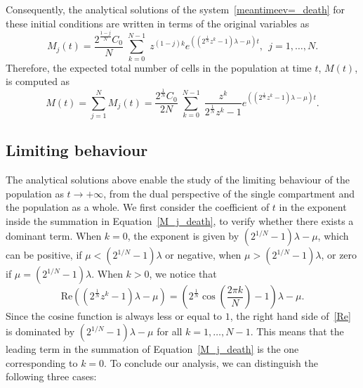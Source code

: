 \documentclass[10pt]{article}
\numberwithin{equation}{section}
\begin{document}
Consequently, the analytical solutions of the system~\eqref{meantimeev=_death} for these initial conditions are written in terms of the original variables as
\begin{equation} \label{M_j_death}
M_j(t)=\frac{2^{\frac{1-j}{N}}C_0}{N} \; \sum_{k=0}^{N-1} 
\; z^{(1-j)k} 
e^{\left(\left(2^{\frac{1}{N}} z^k -1 \right)\lambda - \mu \right) t},
\ \ j=1,\ldots,N.
\end{equation}
Therefore, the  expected total number of cells in the population at time
$t$, $M(t)$, is computed as 
\begin{equation} \label{Mtotal_death}
M(t) = \sum_{j=1}^N M_j(t) = \frac{2^{\frac{1}{N}} C_0}{2N} 
\; \sum_{k=0}^{N-1} \; \frac{z^k}{2^{\frac{1}{N}} z^k -1} e^{\left(\left(2^{\frac{1}{N}} z^k -1\right) \lambda - \mu \right) t }.
\end{equation}

\subsection{Limiting behaviour}
\label{sec:limiting}

The analytical solutions above enable the study of the limiting behaviour of the population  as $t \to + \infty$, from the dual perspective of the single compartment and the  population as a whole. We first consider the coefficient of $t$ in the exponent inside the summation in Equation~\eqref{M_j_death}, to verify whether there exists a dominant term.  
When $k=0$, the exponent is given by $(2^{1/N}-1)\lambda-\mu$, which can be positive, if $\mu < (2^{1/N}-1)\lambda$ or negative, when $\mu > (2^{1/N}-1)\lambda$, or zero if $\mu = (2^{1/N}-1)\lambda$. When $k>0$, we notice that 
\begin{equation} \label{Re}
\text{Re}\left(\left(2^{\frac{1}{N}} z^k - 1 \right) \lambda - \mu \right)= \left( 2^{\frac{1}{N}} \cos{\left(\frac{2\pi k}{N}\right)} - 1 \right)\lambda - \mu.
\end{equation}
Since the cosine function is always less or equal to $1$, the right hand side of~\eqref{Re} is dominated by $\left( 2^{1/N} - 1 \right)\lambda - \mu$ for all $k = 1,\ldots,N-1$. This means that the leading term in the summation of Equation~\eqref{M_j_death} is the one corresponding to $k=0$. To conclude our analysis, we can distinguish the following three cases:
\end{document}

